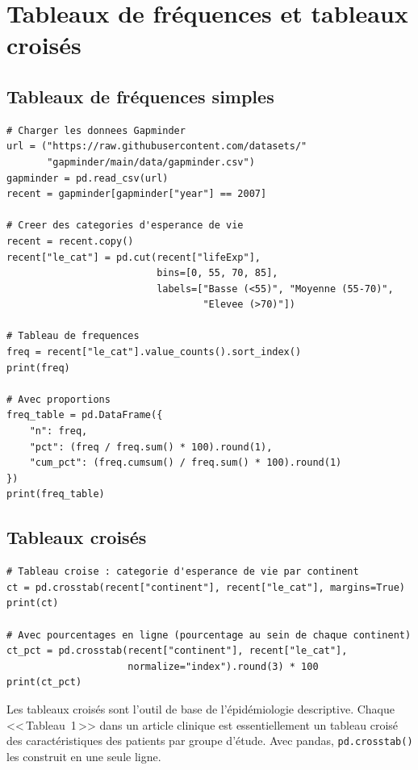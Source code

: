 \section{Tableaux de fr\'equences et tableaux crois\'es}

\subsection{Tableaux de fr\'equences simples}

\begin{verbatim}
# Charger les donnees Gapminder
url = ("https://raw.githubusercontent.com/datasets/"
       "gapminder/main/data/gapminder.csv")
gapminder = pd.read_csv(url)
recent = gapminder[gapminder["year"] == 2007]

# Creer des categories d'esperance de vie
recent = recent.copy()
recent["le_cat"] = pd.cut(recent["lifeExp"],
                          bins=[0, 55, 70, 85],
                          labels=["Basse (<55)", "Moyenne (55-70)",
                                  "Elevee (>70)"])

# Tableau de frequences
freq = recent["le_cat"].value_counts().sort_index()
print(freq)

# Avec proportions
freq_table = pd.DataFrame({
    "n": freq,
    "pct": (freq / freq.sum() * 100).round(1),
    "cum_pct": (freq.cumsum() / freq.sum() * 100).round(1)
})
print(freq_table)
\end{verbatim}

\subsection{Tableaux crois\'es}

\begin{verbatim}
# Tableau croise : categorie d'esperance de vie par continent
ct = pd.crosstab(recent["continent"], recent["le_cat"], margins=True)
print(ct)

# Avec pourcentages en ligne (pourcentage au sein de chaque continent)
ct_pct = pd.crosstab(recent["continent"], recent["le_cat"],
                     normalize="index").round(3) * 100
print(ct_pct)
\end{verbatim}

\begin{clinicalnote}
Les tableaux crois\'es sont l'outil de base de l'\'epid\'emiologie descriptive. Chaque <<\,Tableau~1\,>> dans un article clinique est essentiellement un tableau crois\'e des caract\'eristiques des patients par groupe d'\'etude. Avec pandas, \texttt{pd.crosstab()} les construit en une seule ligne.
\end{clinicalnote}

